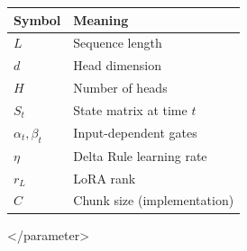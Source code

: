 \begin{table}[H]
\centering
\small
\begin{tabular}{ll}
\toprule
\textbf{Symbol} & \textbf{Meaning} \\
\midrule
$L$ & Sequence length \\
$d$ & Head dimension \\
$H$ & Number of heads \\
$S_t$ & State matrix at time $t$ \\
$\alpha_t, \beta_t$ & Input-dependent gates \\
$\eta$ & Delta Rule learning rate \\
$r_L$ & LoRA rank \\
$C$ & Chunk size (implementation) \\
\bottomrule
\end{tabular}
\end{table}
\textless{}/parameter\textgreater{}

